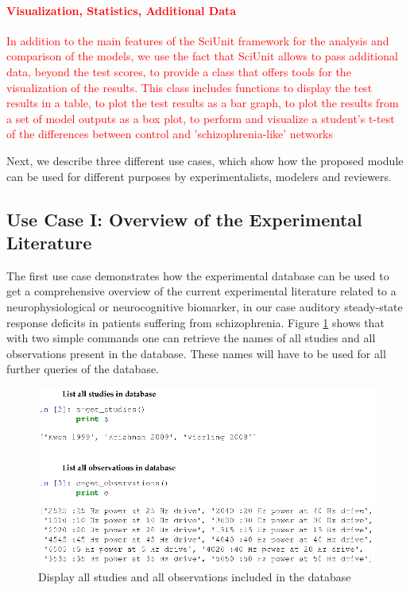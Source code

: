 \documentclass[a4paper,10pt]{article}
\begin{document}
\paragraph{\textcolor{red}{Visualization, Statistics, Additional Data}}

\textcolor{red}{In addition to the main features of the SciUnit framework for the analysis and comparison of the models, we use the fact that SciUnit allows to pass additional data, beyond the test scores, to provide
a class that offers tools for the visualization of the results. This class includes functions to display the test results in a table, to plot the test results as a bar graph, to plot the results from a set of model outputs as 
a box plot, to perform and visualize a student's t-test of the differences between control and 'schizophrenia-like' networks}


Next, we describe three different use cases, which show how the proposed module can be used for different purposes by experimentalists, modelers and reviewers. 


\subsection{Use Case I: Overview of the Experimental Literature}
The first use case demonstrates how the experimental database can be used to get a comprehensive overview of the current experimental literature related to a neurophysiological or neurocognitive biomarker, in our case
auditory steady-state response deficits in patients suffering from schizophrenia. Figure \ref{Fig:ListStudies} shows that with two
simple commands one can retrieve the names of all studies and all observations present in the database. These names will have to be used for all further queries of the database.

\begin{figure}
\includegraphics[width=\textwidth]{Figures/list_studies_observations}
\caption{Display all studies  and all observations included in the database}
\label{Fig:ListStudies}
\end{figure}
\end{document}
